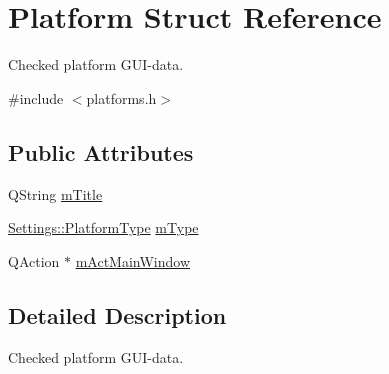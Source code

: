 \hypertarget{struct_platform}{\section{Platform Struct Reference}
\label{struct_platform}
}


Checked platform G\-U\-I-\/data.  




{\ttfamily \#include $<$platforms.\-h$>$}

\subsection*{Public Attributes}
\begin{DoxyCompactItemize}
\item 
Q\-String \hyperlink{struct_platform_a5d5b4b31a3bf54c1b280d3a486de6ebf}{m\-Title}
\item 
\hyperlink{class_settings_a7c94920f2160a5cf261ce822a0ce2ee8}{Settings\-::\-Platform\-Type} \hyperlink{struct_platform_a9234ec239c21c7a0ccb4fc9a36e06977}{m\-Type}
\item 
Q\-Action $\ast$ \hyperlink{struct_platform_af963bc84ee4722f51e58e610a83d69ca}{m\-Act\-Main\-Window}
\end{DoxyCompactItemize}


\subsection{Detailed Description}
Checked platform G\-U\-I-\/data. 

